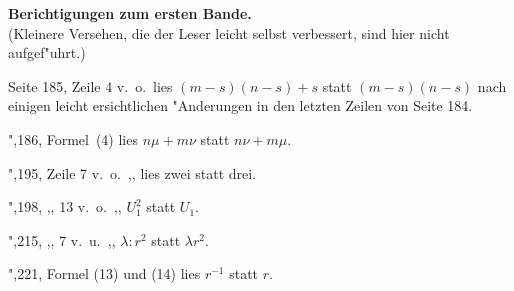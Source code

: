 \documentclass[12pt,a4paper]{article}
\begin{document}
\newpage
\setcounter{page}{732}

\begin{center}
\large\textbf{Berichtigungen zum ersten Bande.}\\[4pt]
\small
(Kleinere Versehen, die der Leser leicht selbst verbessert, sind hier nicht aufgef"uhrt.)
\end{center}

\medskip

\noindent
Seite 185, Zeile 4 v.~o.\ lies $(m-s)(n-s)+s$ statt $(m-s)(n-s)$ nach einigen leicht ersichtlichen "Anderungen in den letzten Zeilen von Seite 184.

\smallskip

\noindent\hspace*{2em}",\hspace{1.8em}186, Formel~(4) lies $n\mu+m\nu$ statt $n\nu+m\mu$.

\smallskip

\noindent\hspace*{2em}",\hspace{1.8em}195, Zeile 7 v.~o.\ \hspace{0.5em},,\hspace{0.5em} lies zwei statt drei.

\smallskip

\noindent\hspace*{2em}",\hspace{1.8em}198, \hspace{2.5em},,\hspace{0.2em} 13 v.~o.\ \hspace{0.5em},,\hspace{0.5em} $U_1^2$ statt $U_1$.

\smallskip

\noindent\hspace*{2em}",\hspace{1.8em}215, \hspace{2.5em},,\hspace{0.2em} \hspace{0.8em}7 v.~u.\ \hspace{0.5em},,\hspace{0.5em} $\lambda:r^2$ statt $\lambda r^2$.

\smallskip

\noindent\hspace*{2em}",\hspace{1.8em}221, Formel (13) und (14) lies $r^{-1}$ statt $r$.
\end{document}

